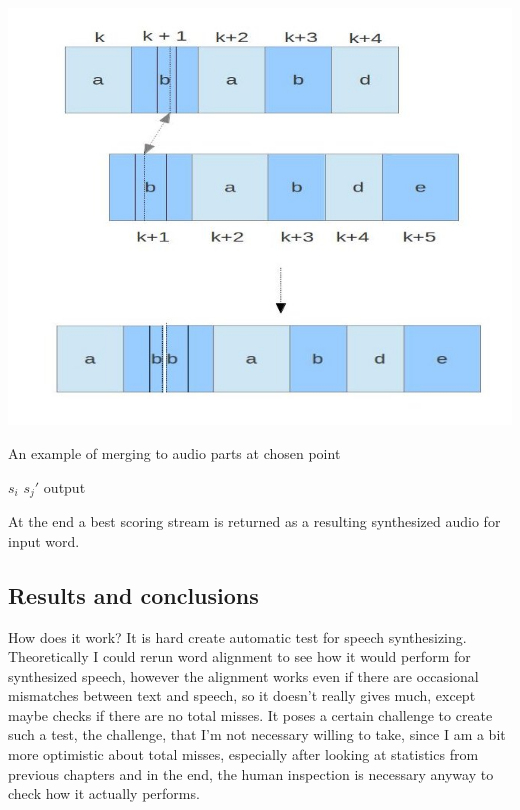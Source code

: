 \documentclass[12pt,a4paper,english]{article}
\begin{document}
\begin{minipage}[0,0]{15cm}
    \includegraphics[scale=0.5]{audio_merging.jpg}
    \caption[]{An example of merging to audio parts at chosen point}
\end{minipage}
\begin{minipage}[15cm,0]{4cm}
$s_i$
\newline
\newline
\newline
\newline
\newline
\newline
$s_j'$
\newline
\newline
\newline
\newline
\newline
\newline
\newline
\newline
output 
\end{minipage}
At the end a best scoring stream is returned as a resulting synthesized audio for input word.

\newpage
\subsection{Results and conclusions}

How does it work? It is hard create automatic test for speech synthesizing. Theoretically I could rerun word alignment to see how it would perform for synthesized speech, however the alignment works even if there are occasional mismatches between text and speech, so it doesn't really gives much, except maybe checks if there are no total misses. It poses a certain challenge to create such a test, the challenge, that I'm not necessary willing to take, since I am a bit more optimistic about total misses, especially after looking at statistics from previous chapters and in the end, the human inspection is necessary anyway to check how it actually performs. \newline
\end{document}
